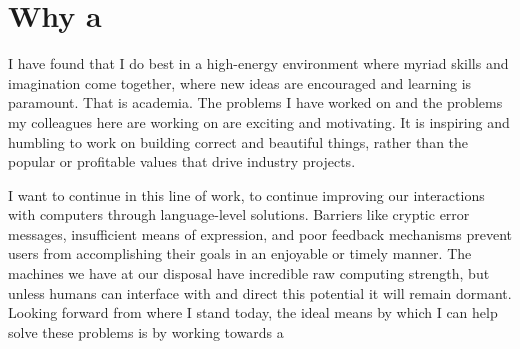 \documentclass{article}
\begin{document}
\section{Why a \phd}
I have found that I do best in a high-energy environment where myriad skills and imagination come together, where new ideas are encouraged and learning is paramount.
That is academia.
The problems I have worked on and the problems my colleagues here are working on are exciting and motivating.
It is inspiring and humbling to work on building correct and beautiful things, rather than the popular or profitable values that drive industry projects.

I want to continue in this line of work, to continue improving our interactions with computers through language-level solutions.
Barriers like cryptic error messages, insufficient means of expression, and poor feedback mechanisms prevent users from accomplishing their goals in an enjoyable or timely manner.
The machines we have at our disposal have incredible raw computing strength, but unless humans can interface with and direct this potential it will remain dormant.
Looking forward from where I stand today, the ideal means by which I can help solve these problems is by working towards a \phd

\end{document}
